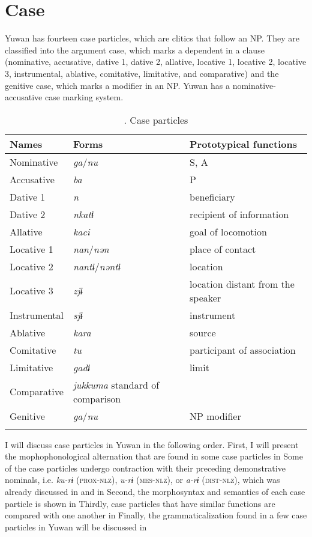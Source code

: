 \section{Case}

Yuwan has fourteen case particles, which are clitics that follow an NP. They are classified into the argument case, which marks a dependent in a clause (nominative, accusative, dative 1, dative 2, allative, locative 1, locative 2, locative 3, instrumental, ablative, comitative, limitative, and comparative) and the genitive case, which marks a modifier in an NP. Yuwan has a nominative-accusative case marking system.

\begin{table}
\caption{\label{tab:key:40}. Case particles}
\begin{tabular}{lll}
\lsptoprule
Names & Forms & Prototypical functions \\
\midrule
Nominative & \textit{ga}/\textit{nu} & S, A \\
Accusative & \textit{ba} & P \\
Dative 1 & \textit{n} & beneficiary \\
Dative 2 & \textit{nkatɨ} & recipient of information \\
Allative & \textit{kaci} & goal of locomotion \\
Locative 1 & \textit{nan}/\textit{nən} & place of contact \\
Locative 2 & \textit{nantɨ}/\textit{nəntɨ}& location \\
Locative 3 & \textit{zjɨ} & location distant from the speaker \\
Instrumental & \textit{sjɨ} & instrument \\
Ablative & \textit{kara} & source \\
Comitative & \textit{tu} & participant of association \\
Limitative & \textit{gadɨ} & limit \\
Comparative & \textit{jukkuma} standard of comparison \\
Genitive & \textit{ga}/\textit{nu} & NP modifier \\
\lspbottomrule
\end{tabular}
\end{table}
I will discuss case particles in Yuwan in the following order. First, I will present the mophophonological alternation that are found in some case particles in  Some of the case particles undergo contraction with their preceding demonstrative nominals, i.e. \textit{ku-rɨ} (\textsc{prox}-\textsc{nlz}), \textit{u-rɨ} (\textsc{mes}-\textsc{nlz}), or \textit{a-rɨ} (\textsc{dist}-\textsc{nlz}), which was already discussed in  and  in  Second, the morphosyntax and semantics of each case particle is shown in  Thirdly, case particles that have similar functions are compared with one another in  Finally, the grammaticalization found in a few case particles in Yuwan will be discussed in 

